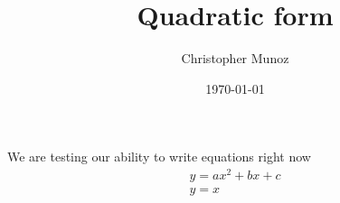 \documentclass{article}
\begin{document}
\title{Quadratic form}
\author{Christopher Munoz}
\date{\today}

We are testing our ability to write equations right now
\begin{equation}
\begin{aligned}
    y = ax^2 + bx + c \\ 
    y = x
\end{aligned}
\end{equation}
\end{document}
